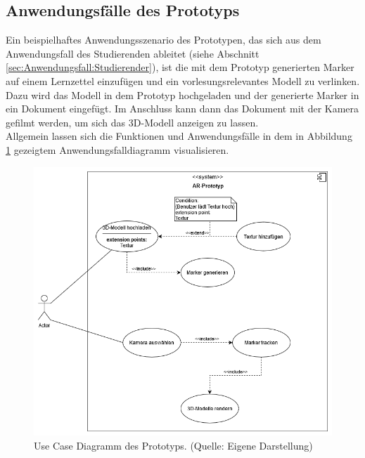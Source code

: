 \subsection{Anwendungsfälle des Prototyps}
Ein beispielhaftes Anwendungsszenario des Prototypen, das sich aus dem Anwendungsfall des Studierenden ableitet (siehe Abschnitt \ref{sec:Anwendungsfall:Studierender}), ist die mit dem Prototyp generierten Marker auf einem Lernzettel einzufügen und ein vorlesungsrelevantes Modell zu verlinken. Dazu wird das Modell in dem Prototyp hochgeladen und der generierte Marker in ein Dokument eingefügt. Im Anschluss kann dann das Dokument mit der Kamera gefilmt werden, um sich das 3D-Modell anzeigen zu lassen.\\
Allgemein lassen sich die Funktionen und Anwendungsfälle in dem in Abbildung \ref{fig:Use-Cases} gezeigtem Anwendungsfalldiagramm visualisieren.
\begin{figure}[h!]
\centering
\includegraphics[width=1.0\textwidth]{Abbildungen/Use-Case-Diagramm.png}
\caption[Use Cases des Prototyps]{Use Case Diagramm des Prototyps. (Quelle: Eigene Darstellung)}
\label{fig:Use-Cases}
\end{figure}


